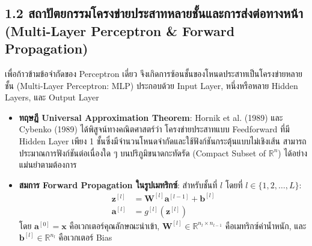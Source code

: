 \documentclass[12pt,a4paper]{article}
\begin{document}
\subsection*{1.2 สถาปัตยกรรมโครงข่ายประสาทหลายชั้นและการส่งต่อทางหน้า\\ \normalsize(Multi-Layer Perceptron \& Forward Propagation)}
เพื่อก้าวข้ามข้อจำกัดของ Perceptron เดี่ยว จึงเกิดการซ้อนชั้นของโหนดประสาทเป็นโครงข่ายหลายชั้น (Multi-Layer Perceptron: MLP) ประกอบด้วย Input Layer, หนึ่งหรือหลาย Hidden Layers, และ Output Layer
\begin{itemize}[leftmargin=18pt, itemsep=2pt]
    \item \textbf{ทฤษฎี Universal Approximation Theorem}: Hornik et al. (1989) และ Cybenko (1989) ได้พิสูจน์ทางคณิตศาสตร์ว่า โครงข่ายประสาทแบบ Feedforward ที่มี Hidden Layer เพียง 1 ชั้นซึ่งมีจำนวนโหนดจำกัดและใช้ฟังก์ชันกระตุ้นแบบไม่เชิงเส้น สามารถประมาณการฟังก์ชันต่อเนื่องใด ๆ บนปริภูมิขนาดกะทัดรัด (Compact Subset of $\mathbb{R}^n$) ได้อย่างแม่นยำตามต้องการ
    \item \textbf{สมการ Forward Propagation ในรูปเมทริกซ์}: สำหรับชั้นที่ $l$ โดยที่ $l \in \{1, 2, \dots, L\}$:
    \begin{align}
    \mathbf{z}^{[l]} &= \mathbf{W}^{[l]} \mathbf{a}^{[l-1]} + \mathbf{b}^{[l]} \\
    \mathbf{a}^{[l]} &= g^{[l]}(\mathbf{z}^{[l]})
    \end{align}
    โดย $\mathbf{a}^{[0]} = \mathbf{x}$ คือเวกเตอร์คุณลักษณะนำเข้า, $\mathbf{W}^{[l]} \in \mathbb{R}^{n_l \times n_{l-1}}$ คือเมทริกซ์ค่าน้ำหนัก, และ $\mathbf{b}^{[l]} \in \mathbb{R}^{n_l}$ คือเวกเตอร์ Bias
\end{itemize}
\end{document}
